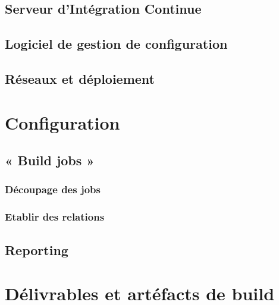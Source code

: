 \documentclass{report}
\begin{document}
        \subsection{Serveur d’Intégration Continue}

        \subsection{Logiciel de gestion de configuration}

        \subsection{Réseaux et déploiement}

      \section{Configuration}

        \subsection{« Build jobs »}

          \subsubsection{Découpage des jobs}

          \subsubsection{Etablir des relations}

        \subsection{Reporting}

      \section{Délivrables et artéfacts de build}

  \listoffigures                  %
\end{document}
